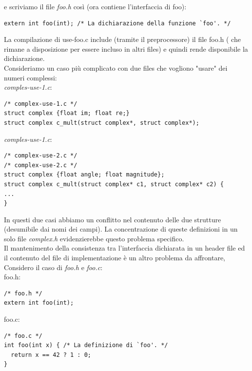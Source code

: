 \documentclass[a4paper,12pt, oneside]{book}
\begin{document}
e scriviamo il file \textit{foo.h} così (ora contiene l'interfaccia di foo):
\begin{verbatim}
extern int foo(int); /* La dichiarazione della funzione `foo'. */
\end{verbatim}
La compilazione di use-foo.c include (tramite il preprocessore) il file
foo.h ( che rimane a disposizione per essere incluso in altri files) e quindi rende disponibile la dichiarazione.\\
Consideriamo un caso più complicato con due files che vogliono "usare" dei
numeri complessi:
\\
\textit{comples-use-1.c}:
\begin{verbatim}
/* complex-use-1.c */
struct complex {float im; float re;}
struct complex c_mult(struct complex*, struct complex*);
\end{verbatim}
\textit{comples-use-1.c}:
\begin{verbatim}
/* complex-use-2.c */
/* complex-use-2.c */
struct complex {float angle; float magnitude};
struct complex c_mult(struct complex* c1, struct complex* c2) {
...
}
\end{verbatim}
In questi due casi abbiamo un conflitto nel contenuto delle due strutture (desumibile dai nomi dei campi). La concentrazione di queste definizioni in un solo file \textit{complex.h }evidenzierebbe questo problema specifico.\\
Il mantenimento della consistenza tra l'interfaccia dichiarata in un header file ed il
contenuto del file di implementazione è un altro problema da affrontare, Considero il caso di \textit{foo.h} e \textit{foo.c}:\\
foo.h:
\begin{verbatim}
/* foo.h */
extern int foo(int);
\end{verbatim}
foo.c:
\begin{verbatim}
/* foo.c */
int foo(int x) { /* La definizione di `foo'. */
  return x == 42 ? 1 : 0;
}
\end{verbatim}
\end{document}
